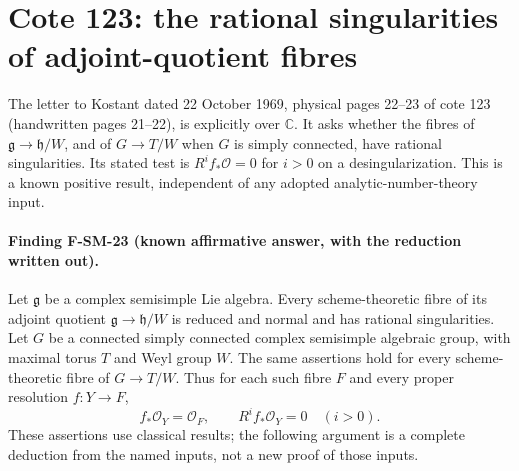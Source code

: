 \section{Cote 123: the rational singularities of adjoint-quotient fibres}
\label{sec:SM-cote123-rational}

The letter to Kostant dated 22 October 1969, physical pages 22--23
of cote 123 (handwritten pages 21--22), is explicitly over
$\mathbb C$.  It asks whether the fibres of
$\mathfrak g\to\mathfrak h/W$, and of $G\to T/W$ when $G$ is
simply connected, have rational singularities.  Its stated test is
$R^if_*\mathcal O=0$ for $i>0$ on a desingularization.
This is a known positive result, independent of any adopted
analytic-number-theory input.

\paragraph{Finding F-SM-23 (known affirmative answer, with the reduction written out).}
Let $\mathfrak g$ be a complex semisimple Lie algebra.
Every scheme-theoretic fibre of its adjoint quotient
$\mathfrak g\to\mathfrak h/W$ is reduced and normal and has
rational singularities.  Let $G$ be a connected simply connected
complex semisimple algebraic group, with maximal torus $T$ and Weyl
group $W$.  The same assertions hold for every scheme-theoretic
fibre of $G\to T/W$.
Thus for each such fibre $F$ and every proper resolution
$f:Y\to F$,
\[
 f_*\mathcal O_Y=\mathcal O_F,\qquad
 R^if_*\mathcal O_Y=0\quad(i>0).
\]
These assertions use classical results; the following argument is a
complete deduction from the named inputs, not a new proof of those
inputs.

